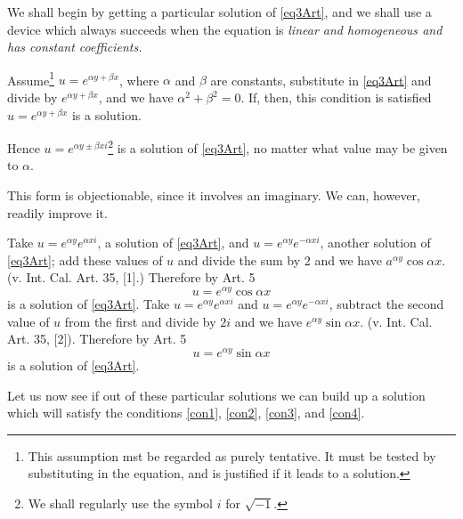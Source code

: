 \documentclass[oneside,12pt]{book}
\begin{document}
We shall begin by getting a particular solution of \eqref{eq3Art}, and we shall use a device which always succeeds when the equation is \textit{linear \emph{and} homogeneous \emph{and has} constant coefficients.} \par 

Assume\footnote{This assumption mst be regarded as purely tentative. It must be tested by substituting in the equation, and is justified if it leads to a solution.\label{note2}} $u=e^{\alpha y+\beta x}$, where $\alpha$ and $\beta$ are constants, substitute in \eqref{eq3Art} and divide by $e^{\alpha y+\beta x}$, and we have $\alpha^2+\beta^2=0$. If, then, this condition is satisfied $u=e^{\alpha y+\beta x}$ is a solution. \par 

Hence $u=e^{\alpha y\pm\beta xi}$\footnote{We shall regularly use the symbol $i$ for $\sqrt{-1}$.} is a solution of \eqref{eq3Art}, no matter what value may be given to $\alpha$. \par 

This form is objectionable, since it involves an imaginary. We can, however, readily improve it. \par 

Take $u=e^{\alpha y}e^{\alpha xi}$, a solution of \eqref{eq3Art}, and $u=e^{\alpha y}e^{-\alpha xi}$, another solution of \eqref{eq3Art}; add these values of $u$ and divide the sum by 2 and we have $a^{\alpha y}\cos\alpha x$. (v. Int. Cal. Art. 35, [1].) Therefore by Art. 5
\begin{equation}
    u=e^{\alpha y}\cos\alpha x
    \label{equ5}
\end{equation}
is a solution of \eqref{eq3Art}. Take $u=e^{\alpha y}e^{\alpha xi}$ and $u=e^{\alpha y}e^{-\alpha xi}$, subtract the second value of $u$ from the first and divide by $2i$ and we have $e^{\alpha y}\sin\alpha x$. (v. Int. Cal. Art. 35, [2]). Therefore by Art. 5
\begin{equation}
    u=e^{\alpha y}\sin\alpha x
    \label{equ6}
\end{equation}
is a solution of \eqref{eq3Art}. \par 

Let us now see if out of these particular solutions we can build up a solution which will satisfy the conditions \eqref{con1}, \eqref{con2}, \eqref{con3}, and \eqref{con4}. \par 
\end{document}
